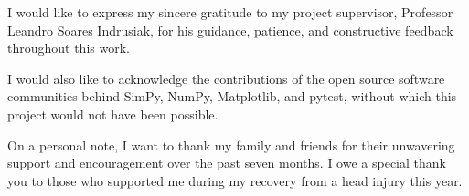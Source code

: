 I would like to express my sincere gratitude to my project supervisor, Professor Leandro Soares Indrusiak, for his guidance, patience, and constructive feedback throughout this work. \par

\vspace{1cm}

I would also like to acknowledge the contributions of the open source software communities behind SimPy, NumPy, Matplotlib, and pytest, without which this project would not have been possible. \par

\vspace{1cm}

On a personal note, I want to thank my family and friends for their unwavering support and encouragement over the past seven months. I owe a special thank you to those who supported me during my recovery from a head injury this year. \par